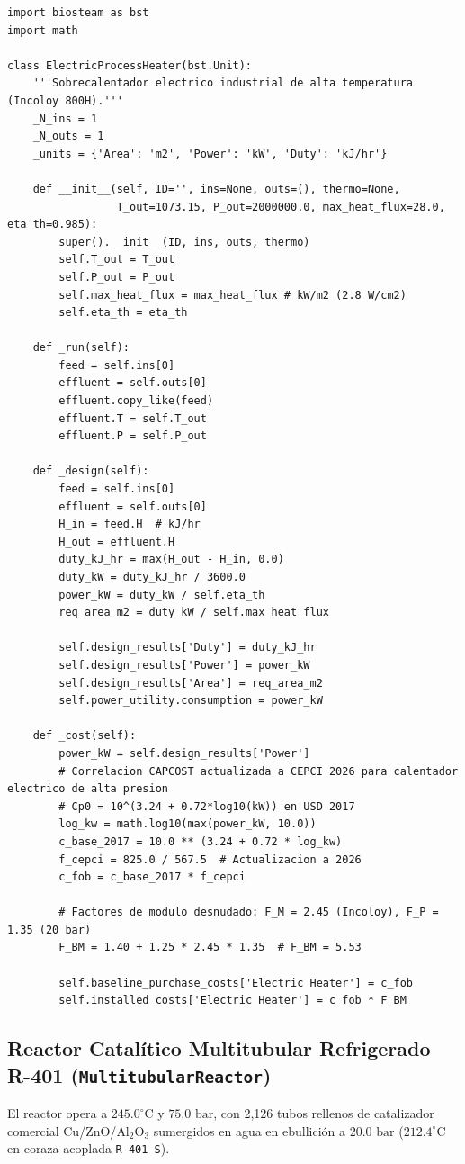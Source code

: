 \documentclass[11pt,letterpaper]{article}
\begin{document}
\begin{lstlisting}[caption={Clase personalizada ElectricProcessHeater en BioSTEAM}]
import biosteam as bst
import math

class ElectricProcessHeater(bst.Unit):
    '''Sobrecalentador electrico industrial de alta temperatura (Incoloy 800H).'''
    _N_ins = 1
    _N_outs = 1
    _units = {'Area': 'm2', 'Power': 'kW', 'Duty': 'kJ/hr'}
    
    def __init__(self, ID='', ins=None, outs=(), thermo=None,
                 T_out=1073.15, P_out=2000000.0, max_heat_flux=28.0, eta_th=0.985):
        super().__init__(ID, ins, outs, thermo)
        self.T_out = T_out
        self.P_out = P_out
        self.max_heat_flux = max_heat_flux # kW/m2 (2.8 W/cm2)
        self.eta_th = eta_th

    def _run(self):
        feed = self.ins[0]
        effluent = self.outs[0]
        effluent.copy_like(feed)
        effluent.T = self.T_out
        effluent.P = self.P_out

    def _design(self):
        feed = self.ins[0]
        effluent = self.outs[0]
        H_in = feed.H  # kJ/hr
        H_out = effluent.H
        duty_kJ_hr = max(H_out - H_in, 0.0)
        duty_kW = duty_kJ_hr / 3600.0
        power_kW = duty_kW / self.eta_th
        req_area_m2 = duty_kW / self.max_heat_flux
        
        self.design_results['Duty'] = duty_kJ_hr
        self.design_results['Power'] = power_kW
        self.design_results['Area'] = req_area_m2
        self.power_utility.consumption = power_kW

    def _cost(self):
        power_kW = self.design_results['Power']
        # Correlacion CAPCOST actualizada a CEPCI 2026 para calentador electrico de alta presion
        # Cp0 = 10^(3.24 + 0.72*log10(kW)) en USD 2017
        log_kw = math.log10(max(power_kW, 10.0))
        c_base_2017 = 10.0 ** (3.24 + 0.72 * log_kw)
        f_cepci = 825.0 / 567.5  # Actualizacion a 2026
        c_fob = c_base_2017 * f_cepci
        
        # Factores de modulo desnudado: F_M = 2.45 (Incoloy), F_P = 1.35 (20 bar)
        F_BM = 1.40 + 1.25 * 2.45 * 1.35  # F_BM = 5.53
        
        self.baseline_purchase_costs['Electric Heater'] = c_fob
        self.installed_costs['Electric Heater'] = c_fob * F_BM
\end{lstlisting}

\subsection{Reactor Catalítico Multitubular Refrigerado R-401 (\texttt{MultitubularReactor})}
El reactor opera a $245.0^\circ\text{C}$ y $75.0\text{ bar}$, con 2,126 tubos rellenos de catalizador comercial Cu/ZnO/$\text{Al}_2\text{O}_3$ sumergidos en agua en ebullición a $20.0\text{ bar}$ ($212.4^\circ\text{C}$ en coraza acoplada \texttt{R-401-S}).
\end{document}

